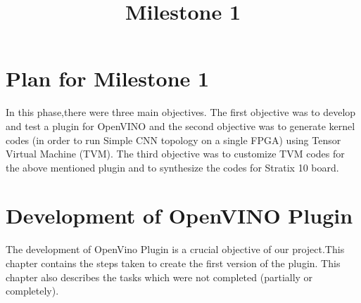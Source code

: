 \documentclass[titlepage]{report}
\title{\textbf{Milestone 1}}
\begin{document}

\tableofcontents{}
\newpage

\chapter{Plan for Milestone 1}
In this phase,there were three main objectives. The first objective was to develop and test a plugin for OpenVINO and the second objective was to generate kernel codes (in order to run Simple CNN topology on a single FPGA) using Tensor Virtual Machine (TVM). 
The third objective was to customize TVM codes for the above mentioned plugin and to synthesize the codes for Stratix 10 board.



\chapter{Development of OpenVINO Plugin}
The development of OpenVino Plugin is a crucial objective of our project.This chapter contains the steps taken to create the first version of the plugin. This chapter also describes the tasks which were not completed (partially or completely). 
\end{document}
